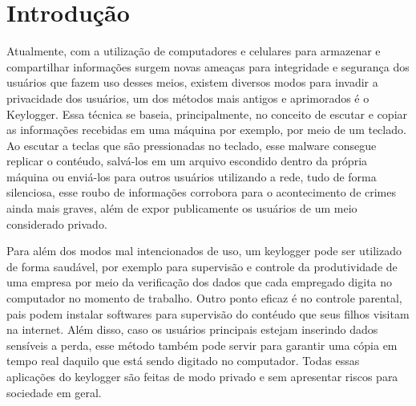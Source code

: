\documentclass[applsci,article,submit,pdftex,moreauthors]{Definitions/mdpi}
\begin{document}
\section{Introdução}
Atualmente, com a utilização de computadores e celulares para armazenar e compartilhar informações surgem novas ameaças para integridade e segurança dos usuários que fazem uso desses meios, existem diversos modos para invadir a privacidade dos usuários, um dos métodos mais antigos e aprimorados é o
Keylogger. Essa técnica se baseia, principalmente, no conceito de escutar e copiar as informações recebidas em uma máquina por exemplo, por meio de um teclado. Ao escutar a teclas que são pressionadas no teclado, esse malware consegue replicar o contéudo, salvá-los em um arquivo escondido  dentro da própria máquina
ou enviá-los para outros usuários utilizando a rede, tudo de forma silenciosa, esse roubo de informações corrobora para o acontecimento de crimes ainda mais graves, além de expor publicamente os usuários de um meio considerado privado.

Para além dos modos mal intencionados de uso, um keylogger pode ser utilizado de forma saudável, por exemplo para supervisão e controle da produtividade de uma empresa por meio da verificação dos dados que cada empregado digita no computador no momento de trabalho. Outro ponto eficaz é no controle parental, pais podem instalar softwares para supervisão do contéudo que seus filhos visitam na internet. Além disso, caso os usuários principais estejam inserindo dados sensíveis a perda, esse método também pode servir para garantir uma cópia em tempo real daquilo que está sendo digitado no computador. Todas essas aplicações do keylogger são feitas de modo privado e sem apresentar riscos  para sociedade em geral. 
\end{document}
